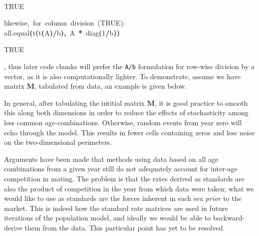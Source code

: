 \documentclass[reqno,12pt,oneside,a4paper]{report} %
\newcommand{\hlnumber}[1]{\textcolor[rgb]{0.0823529411764706,0.0784313725490196,0.709803921568627}{#1}}%
\newcommand{\hlfunctioncall}[1]{\textcolor[rgb]{1,0,0}{#1}}%
\newcommand{\hlkeyword}[1]{\textcolor[rgb]{0,0,0}{\textbf{#1}}}%
\newcommand{\hlcomment}[1]{\textcolor[rgb]{0.8,0.8,0.8}{#1}}%
\newcommand{\hlsymbol}[1]{\textcolor[rgb]{0,0,0}{#1}}%
\newcommand{\hlprompt}[1]{\textcolor[rgb]{0,0,0}{#1}}%
\newcommand{\hlstd}[1]{\textcolor[rgb]{0,0,0}{#1}}%
\newenvironment{Houtput}{\raggedright}{%
%
}
\theoremstyle{plain}
\theoremstyle{definition}
\theoremstyle{remark}
\numberwithin{theorem}{chapter}     %
\renewenvironment{Schunk}{\vspace{\topsep}}{\vspace{\topsep}}
\begin{document}
\begin{Houtput}
\normalfont
\hspace*{\fill}\\
\hlstd{}\begin{Schunk}
\begin{Soutput}
[1] TRUE
\end{Soutput}
\ttfamily\noindent
\hlprompt{\usebox{\hlnormalsizeboxgreaterthan}{\ }}\hlcomment{\usebox{\hlnormalsizeboxhash}{\ }likewise,{\ }for{\ }column{\ }division{\ }(TRUE):}\mbox{}
\normalfont
\hspace*{\fill}\\
\hlstd{}\ttfamily\noindent
\hlprompt{\usebox{\hlnormalsizeboxgreaterthan}{\ }}\hlfunctioncall{all.equal}\hlkeyword{(}\hlfunctioncall{t}\hlkeyword{(}\hlfunctioncall{t}\hlkeyword{(}\hlsymbol{A}\hlkeyword{)}\hlkeyword{/}\hlsymbol{b}\hlkeyword{)}\hlkeyword{,}{\ }\hlsymbol{A}{\ }\hlkeyword{\usebox{\hlnormalsizeboxpercent}*\usebox{\hlnormalsizeboxpercent}}{\ }\hlfunctioncall{diag}\hlkeyword{(}\hlnumber{1}\hlkeyword{/}\hlsymbol{b}\hlkeyword{)}\hlkeyword{)}\mbox{}
\normalfont
\hspace*{\fill}\\
\hlstd{}\begin{Soutput}
[1] TRUE
\end{Soutput}

\end{Schunk}
\end{Houtput}

\noindent, thus later code chunks will prefer the \texttt{A/b} formulation for row-wise division by a vector, as it is also computationally lighter. To demonstrate, assume we have matrix $\bm{M}$, tabulated from data, an example is given below.

In general, after tabulating the intitial matrix $\bm{M}$, it is good practice to smooth this along both dimensions in order to reduce the effects of stochasticity among less common age-combinations. Otherwise, random events from year zero will echo through the model. This results in fewer cells containing zeros and less noise on the two-dimensional perimeters. 

Arguments have been made that methods using data based on all age combinations from a given year still do not adequately account for inter-age competition in mating. The problem is that the rates derived as standards are also the product of competition in the year from which data were taken; what we would like to use as standards are the forces inherent in each sex \textit{prior} to the market. This is indeed how the standard rate matrices are used in future iterations of the population model, and ideally we would be able to backward-derive them from the data. This particular point has yet to be resolved.
\end{document}

